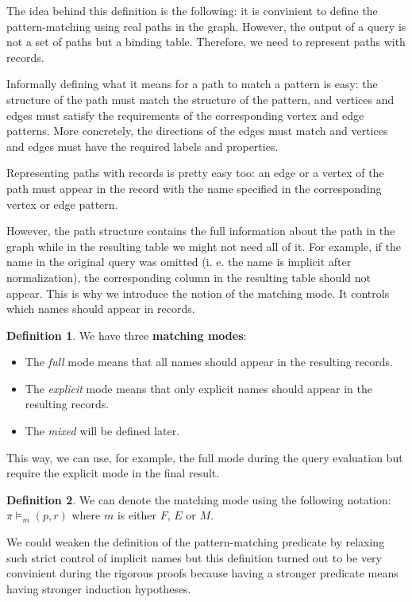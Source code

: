 \documentclass[14pt]{constructor-thesis}
\theoremstyle{definition}
\newtheorem*{definition}{Definition}
\begin{document}
The idea behind this definition is the following: it is convinient to define the pattern-matching using real paths in the graph. However, the output of a query is not a set of paths but a binding table. Therefore, we need to represent paths with records.

Informally defining what it means for a path to match a pattern is easy: the structure of the path must match the structure of the pattern, and vertices and edges must satisfy the requirements of the corresponding vertex and edge patterns. More concretely, the directions of the edges must match and vertices and edges must have the required labels and properties.

Representing paths with records is pretty easy too: an edge or a vertex of the path must appear in the record with the name specified in the corresponding vertex or edge pattern.

However, the path structure contains the full information about the path in the graph while in the resulting table we might not need all of it. For example, if the name in the original query was omitted (i. e. the name is implicit after normalization), the corresponding column in the resulting table should not appear. This is why we introduce the notion of the matching mode. It controls which names should appear in records.

\begin{definition}
  We have three \textbf{matching modes}:
  \begin{itemize}
    \item The \textit{full} mode means that all names should appear in the resulting records.
    \item The \textit{explicit} mode means that only explicit names should appear in the resulting records.
    \item The \textit{mixed} will be defined later.
  \end{itemize} 
\end{definition}

This way, we can use, for example, the full mode during the query evaluation but require the explicit mode in the final result.

\begin{definition}
  We can denote the matching mode using the following notation:
  $ \pi \models_m (p, r) $
  where $m$ is either $F$, $E$ or $M$.
\end{definition}

We could weaken the definition of the pattern-matching predicate by relaxing such strict control of implicit names but this definition turned out to be very convinient during the rigorous proofs because having a stronger predicate means having stronger induction hypotheses.
\end{document}
